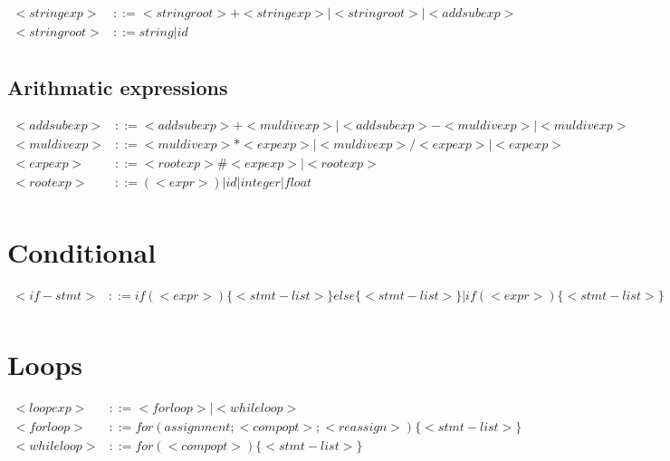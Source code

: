 \documentclass{report}
\begin{document}
\begin{equation}
\begin{split}
  <stringexp> & ::= <stringroot> + <stringexp> | <stringroot> | <addsubexp>  \\
  <stringroot> & ::= string | id \\
\end{split}
\end{equation}

\subsection{Arithmatic expressions}

\begin{equation}
\begin{split}
  <addsubexp> & ::= <addsubexp> + <muldivexp> | <addsubexp> - <muldivexp> | <muldivexp> \\
  <muldivexp> & ::= <muldivexp> * <expexp> | <muldivexp> / <expexp> | <expexp> \\
  <expexp> & ::= <rootexp> \# <expexp> | <rootexp> \\
  <rootexp> & ::= (<expr>) |  id  |  integer  |  float \\
\end{split}
\end{equation}

\section{Conditional}

\begin{equation}
\begin{split}
  <if-stmt> & ::= if (<expr>) \{ <stmt-list> \} else \{ <stmt-list> \} | if (<expr>) \{ <stmt-list> \} \\
\end{split}
\end{equation}

\section{Loops}

\begin{equation}
\begin{split}
  <loopexp> & ::= <forloop> | <whileloop> \\
  <forloop> & ::= for (assignment; <compopt>; <reassign>) \{ <stmt-list> \} \\
  <whileloop> & ::= for (<compopt>) \{ <stmt-list> \} \\
\end{split}
\end{equation}
\end{document}

